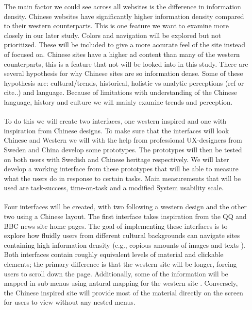 The main factor we could see across all websites is the difference in information density. Chinese websites have significantly higher information density compared to their western counterparts. This is one feature we want to examine more closely in our later study. Colors and navigation will be explored but not prioritized. These will be included to give a more accurate feel of the site instead of focused on. Chinese sites have a higher ad content than many of the western counterparts, this is a feature that not will be looked into in this study.   There are several hypothesis for why Chinese sites are so information dense. Some of these hypothesis are: cultural/trends, historical, holistic vs analytic perceptions (ref or cite..) and language. Because of limitations with understanding of the Chinese language, history and culture we will mainly examine trends and perception.
 \\\\
  To do this we will create two interfaces, one western inspired and one with inspiration from Chinese designs. To make sure that the interfaces will look Chinese and Western we will with the help from professional UX-designers from Sweden and China develop some prototypes. The prototypes will then be tested on both users with Swedish and Chinese heritage respectively. We will later develop a working interface from these prototypes that will be able to measure what the users do in response to certain tasks. Main measurements that will be used are task-success, time-on-task and a modified System usability scale. \cite{brooke1996sus} 
  \\\\
  Four interfaces will be created, with two following a western design and the other two using a Chinese layout. The first interface takes inspiration from the QQ and BBC news site home pages. The goal of implementing these interfaces is to explore how fluidly users from different cultural backgrounds can navigate sites containing high information density (e.g., copious amounts of images and texts ). Both interfaces contain roughly equivalent levels of material and clickable elements; the primary difference is that the western site will be longer, forcing users to scroll down the page. Additionally, some of the information will be mapped in sub-menus using natural mapping for the western site \cite{Norman}. Conversely, the Chinese inspired site will provide most of the material directly on the screen for users to view without any nested menus. 
  \\\\
